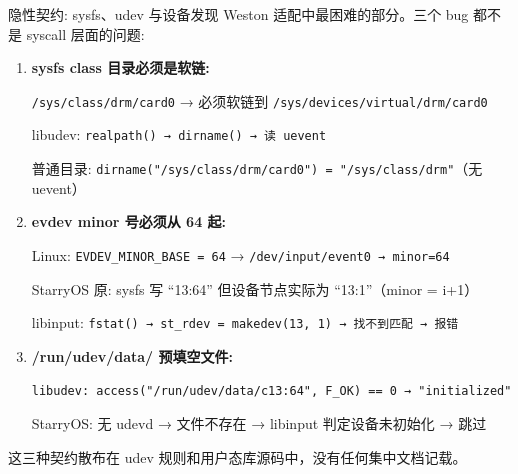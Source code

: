 \documentclass[aspectratio=169,10pt]{ctexbeamer}
\newcommand{\highlight}[1]{\textcolor{accent}{#1}}
\begin{document}
\begin{frame}[shrink=20]{隐性契约: sysfs、udev 与设备发现}
Weston 适配中\highlight{最困难的部分}。三个 bug 都不是 syscall 层面的问题:

\vspace{1mm}
\begin{enumerate}
  \item \textbf{sysfs class 目录必须是软链:}

  \texttt{/sys/class/drm/card0} → 必须软链到 \texttt{/sys/devices/virtual/drm/card0}

  libudev: \texttt{realpath() → dirname() → 读 uevent}

  普通目录: \texttt{dirname("/sys/class/drm/card0") = "/sys/class/drm"}（无 uevent）

  \item \textbf{evdev minor 号必须从 64 起:}

  Linux: \texttt{EVDEV\_MINOR\_BASE = 64} → \texttt{/dev/input/event0 → minor=64}

  StarryOS 原: sysfs 写 ``13:64'' 但设备节点实际为 ``13:1''（minor = i+1）

  libinput: \texttt{fstat() → st\_rdev = makedev(13, 1) → 找不到匹配 → 报错}

  \item \textbf{/run/udev/data/ 预填空文件:}

  \texttt{libudev: access("/run/udev/data/c13:64", F\_OK) == 0 → "initialized"}

  StarryOS: 无 udevd → 文件不存在 → libinput 判定设备未初始化 → 跳过
\end{enumerate}

这三种契约散布在 udev 规则和用户态库源码中，没有任何集中文档记载。
\end{frame}

\end{document}
